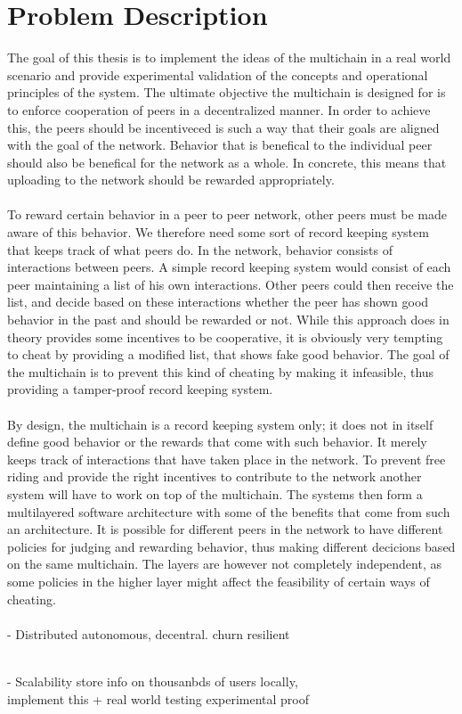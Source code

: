 \chapter{Problem Description}
The goal of this thesis is to implement the ideas of the multichain in a real world scenario and provide experimental validation of the concepts and operational principles of the system. The ultimate objective the multichain is designed for is to enforce cooperation of peers in a decentralized manner. In order to achieve this, the peers should be incentiveced is such a way that their goals are aligned with the goal of the network. Behavior that is benefical to the individual peer should also be benefical for the network as a whole. In concrete, this means that uploading to the network should be rewarded appropriately.\\
\\
To reward certain behavior in a peer to peer network, other peers must be made aware of this behavior. We therefore need some sort of record keeping system that keeps track of what peers do. In the network, behavior consists of interactions between peers. A simple record keeping system would consist of each peer maintaining a list of his own interactions. Other peers could then receive the list, and decide based on these interactions whether the peer has shown good behavior in the past and should be rewarded or not. While this approach does in theory provides some incentives to be cooperative, it is obviously very tempting to cheat by providing a modified list, that shows fake good behavior. The goal of the multichain is to prevent this kind of cheating by making it infeasible, thus providing a tamper-proof record keeping system.\\
\\
By design, the multichain is a record keeping system only; it does not in itself define good behavior or the rewards that come with such behavior. It merely keeps track of interactions that have taken place in the network. To prevent free riding and provide the right incentives to contribute to the network another system will have to work on top of the multichain. The systems then form a multilayered software architecture with some of the benefits that come from such an architecture. It is possible for different peers in the network to have different policies for judging and rewarding behavior, thus making different decicions based on the same multichain. The layers are however not completely independent, as some policies in the higher layer might affect the feasibility of certain ways of cheating.\\
\\
- Distributed	
autonomous, decentral.
churn resilient 

\\
- Scalability 
store info on thousanbds of users locally, 
\\
implement this + real world testing experimental proof
\\

